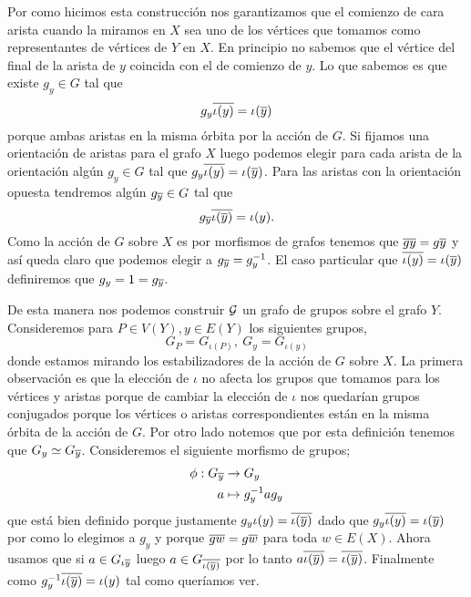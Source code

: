 \documentclass[tesis.tex]{subfiles}
\newcommand{\cG}{ {\cal G} }
\begin{document}
Por como hicimos esta construcción nos garantizamos que el comienzo de cara arista cuando la miramos en $X$ sea uno de los vértices que tomamos como representantes de vértices de $Y$ en $X$.
En principio no sabemos que el vértice del final de la arista de $y$ coincida con el de comienzo de $y$. 
Lo que sabemos es que existe $g_y \in G$ tal que 
\[
	g_y \overline{\iota (y)} = \iota (\overline y)
\]
porque ambas aristas en la misma órbita por la acción de $G$.
Si fijamos una orientación de aristas para el grafo $X$ luego podemos elegir para cada arista de la orientación algún $g_y \in G$ tal que $g_y \overline{\iota (y)} = \iota (\overline y)$.
Para las aristas con la orientación opuesta tendremos algún $g_{\overline y} \in G$ tal que 
\[
	g_{\overline y} \overline{\iota(\overline y)} = \iota(y).
\]
Como la acción de $G$ sobre $X$ es por morfismos de grafos tenemos que $\overline {g y} = g \overline y$ y así queda claro que podemos elegir a $g_{\overline y} = g_{y}^{-1}$.
El caso particular que $\overline{\iota (y)} = \iota (\overline y)$ definiremos que $g_y = 1 = g_{\overline y}$.

De esta manera nos podemos construir $\cG$ un grafo de grupos sobre el grafo $Y$.
Consideremos para $P \in V(Y), y \in E(Y)$ los siguientes grupos,
\[
	G_P = G_{\iota (P)}, \ G_y = G_{\iota(y)}
\]
donde estamos mirando los estabilizadores de la acción de $G$ sobre $X$.
La primera observación es que la elección de $\iota$ no afecta los grupos que tomamos para los vértices y aristas porque de cambiar la elección de $\iota$ nos quedarían grupos conjugados porque los vértices o aristas correspondientes están en la misma órbita de la acción de $G$.
Por otro lado notemos que por esta definición tenemos que $G_y \simeq G_{\overline y}$.
Consideremos el siguiente morfismo de grupos;
\begin{align*}
	\phi: G_{\overline y} &\to G_{y} \\
	a &\mapsto g_{y}^{-1}ag_{y}
\end{align*}
que está bien definido porque justamente $g_y \iota(y) = \overline{\iota(\overline y)}$ dado que $g_y \overline{\iota(y)} = \iota (\overline y)$ por como lo elegimos a $g_y$ y porque $\overline{gw} = g \overline w$ para toda $w \in E(X)$.
Ahora usamos que si $a \in G_{\iota{\overline y}}$ luego $a \in G_{\overline{\iota(\overline y)}}$ por lo tanto $a \overline{\iota(\overline y)} = \overline{\iota(\overline y)} $.
Finalmente como $ g_{y}^{-1} \overline {\iota (\overline y) } = \iota (y)$ tal como queríamos ver.
\end{document}
